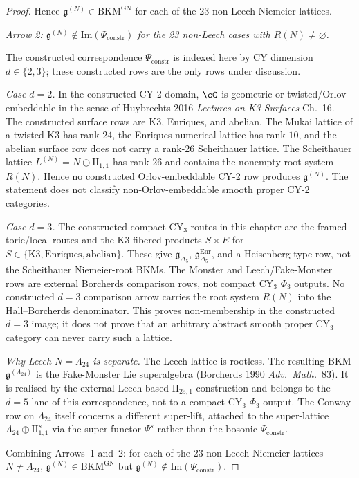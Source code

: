 \begin{proof}
Hence $\mathfrak{g}^{(N)} \in \mathrm{BKM}^{\mathrm{GN}}$ for each of the 23 non-Leech Niemeier lattices.

\emph{Arrow 2: $\mathfrak{g}^{(N)} \notin \mathrm{Im}(\Psi_{\mathrm{constr}})$ for the 23 non-Leech cases with $R(N) \neq \varnothing$.}

The constructed correspondence $\Psi_{\mathrm{constr}}$ is indexed here by CY dimension $d \in \{2, 3\}$; these constructed rows are the only rows under discussion.

\emph{Case $d = 2$.} In the constructed CY-2 domain, $\cC$ is geometric or twisted/Orlov-embeddable in the sense of Huybrechts 2016 \emph{Lectures on K3 Surfaces} Ch.~16. The constructed surface rows are K3, Enriques, and abelian. The Mukai lattice of a twisted K3 has rank $24$, the Enriques numerical lattice has rank $10$, and the abelian surface row does not carry a rank-$26$ Scheithauer lattice. The Scheithauer lattice $L^{(N)}=N\oplus \mathrm{II}_{1,1}$ has rank $26$ and contains the nonempty root system $R(N)$. Hence no constructed Orlov-embeddable CY-2 row produces $\mathfrak{g}^{(N)}$. The statement does not classify non-Orlov-embeddable smooth proper CY-2 categories.

\emph{Case $d = 3$.} The constructed compact CY$_3$ routes in this chapter are the framed toric/local routes and the K3-fibered products $S\times E$ for $S\in\{\mathrm{K3},\mathrm{Enriques},\mathrm{abelian}\}$. These give $\mathfrak{g}_{\Delta_5}$, $\mathfrak{g}_{\Delta_5}^{\mathrm{Enr}}$, and a Heisenberg-type row, not the Scheithauer Niemeier-root BKMs. The Monster and Leech/Fake-Monster rows are external Borcherds comparison rows, not compact CY$_3$ $\Phi_3$ outputs. No constructed $d=3$ comparison arrow carries the root system $R(N)$ into the Hall--Borcherds denominator. This proves non-membership in the constructed \(d=3\) image; it does not prove that an arbitrary abstract smooth proper CY$_3$ category can never carry such a lattice.

\emph{Why Leech $N = \Lambda_{24}$ is separate.} The Leech lattice is rootless. The resulting BKM $\mathfrak{g}^{(\Lambda_{24})}$ is the Fake-Monster Lie superalgebra (Borcherds 1990 \emph{Adv.\ Math.}~83). It is realised by the external Leech-based $\mathrm{II}_{25,1}$ construction and belongs to the \(d=5\) lane of this correspondence, not to a compact CY$_3$ $\Phi_3$ output. The Conway row on $\Lambda_{24}$ itself concerns a different super-lift, attached to the super-lattice $\Lambda_{24}\oplus\mathrm{II}_{1,1}^{s}$ via the super-functor $\Psi^{s}$ rather than the bosonic $\Psi_{\mathrm{constr}}$.

Combining Arrows~1 and~2: for each of the 23 non-Leech Niemeier lattices $N \neq \Lambda_{24}$, $\mathfrak{g}^{(N)} \in \mathrm{BKM}^{\mathrm{GN}}$ but $\mathfrak{g}^{(N)} \notin \mathrm{Im}(\Psi_{\mathrm{constr}})$.
\end{proof}


